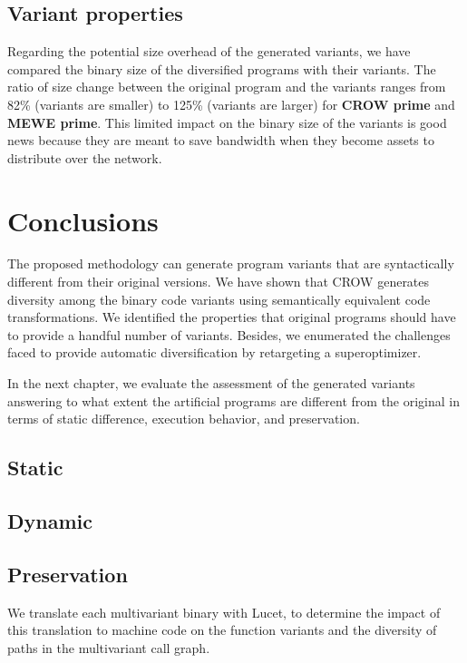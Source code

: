 \subsection{Variant properties}

Regarding the potential size overhead of the generated variants, we have compared the \wasm binary size of the diversified programs with their variants. The ratio of size change between the original program and the variants ranges from 82\% (variants are smaller) to 125\% (variants are larger) for \textbf{CROW prime} and \textbf{MEWE prime}. This limited impact on the binary size of the variants is good news because they are meant to save bandwidth when they become assets to distribute over the network.

\pagebreak
\section{Conclusions}

The proposed methodology can generate program variants that are syntactically different from their original versions. We have shown that CROW generates diversity among the binary code variants using semantically equivalent code transformations. We identified the properties that original programs should have to provide a handful number of variants. Besides, we enumerated the challenges faced to provide automatic diversification by retargeting a superoptimizer.

In the next chapter, we evaluate the assessment of the generated variants answering to what extent the artificial programs are different from the original in terms of static difference, execution behavior, and preservation.


\subsection{Static}
\subsection{Dynamic}
\subsection{Preservation}

We translate each \wasm multivariant binary with Lucet, to determine the impact of this translation to machine code on the function variants and the diversity of paths in the multivariant call graph. 

